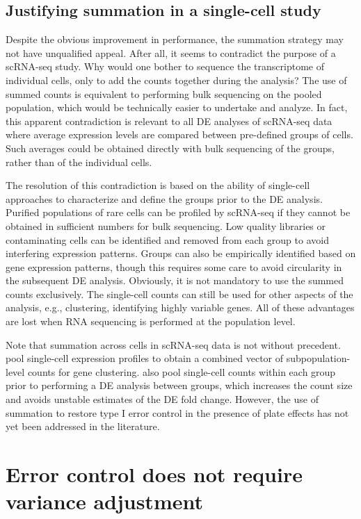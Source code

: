 \documentclass[oupdraft]{bio}
\begin{document}
\subsection{Justifying summation in a single-cell study}
Despite the obvious improvement in performance, the summation strategy may not have unqualified appeal.
After all, it seems to contradict the purpose of a scRNA-seq study. 
Why would one bother to sequence the transcriptome of individual cells, only to add the counts together during the analysis?
The use of summed counts is equivalent to performing bulk sequencing on the pooled population, which would be technically easier to undertake and analyze.
In fact, this apparent contradiction is relevant to all DE analyses of scRNA-seq data where average expression levels are compared between pre-defined groups of cells.
Such averages could be obtained directly with bulk sequencing of the groups, rather than of the individual cells.

The resolution of this contradiction is based on the ability of single-cell approaches to characterize and define the groups prior to the DE analysis.
Purified populations of rare cells can be profiled by scRNA-seq if they cannot be obtained in sufficient numbers for bulk sequencing.
Low quality libraries or contaminating cells can be identified and removed from each group to avoid interfering expression patterns.
Groups can also be empirically identified based on gene expression patterns, though this requires some care to avoid circularity in the subsequent DE analysis.
Obviously, it is not mandatory to use the summed counts exclusively. 
The single-cell counts can still be used for other aspects of the analysis, e.g., clustering, identifying highly variable genes.
All of these advantages are lost when RNA sequencing is performed at the population level.

Note that summation across cells in scRNA-seq data is not without precedent.
\cite{jaitin2014massively} pool single-cell expression profiles to obtain a combined vector of subpopulation-level counts for gene clustering.
\cite{klein2015droplet} also pool single-cell counts within each group prior to performing a DE analysis between groups,
    which increases the count size and avoids unstable estimates of the DE fold change.
However, the use of summation to restore type I error control in the presence of plate effects has not yet been addressed in the literature.

\section{Error control does not require variance adjustment}
\end{document}
